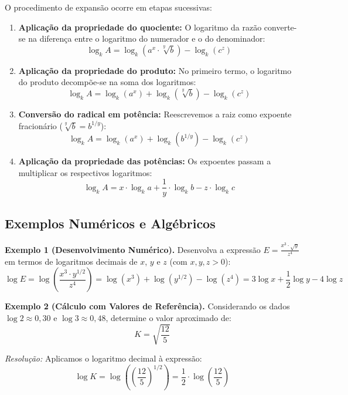 \documentclass[12pt,a4paper]{report}
\begin{document}
	O procedimento de expansão ocorre em etapas sucessivas:
	
	\begin{destaque}
		\begin{enumerate}[label=\textbf{\arabic*.}]
			\item \textbf{Aplicação da propriedade do quociente:}  
			O logaritmo da razão converte-se na diferença entre o logaritmo do numerador e o do denominador:
			$$\log_k A = \log_k \left( a^x \cdot \sqrt[y]{b} \right) - \log_k (c^z)$$
			
			\item \textbf{Aplicação da propriedade do produto:}  
			No primeiro termo, o logaritmo do produto decompõe-se na soma dos logaritmos:
			$$\log_k A = \log_k (a^x) + \log_k (\sqrt[y]{b}) - \log_k (c^z)$$
			
			\item \textbf{Conversão do radical em potência:}  
			Reescrevemos a raiz como expoente fracionário ($\sqrt[y]{b} = b^{1/y}$):
			$$\log_k A = \log_k (a^x) + \log_k \left( b^{1/y} \right) - \log_k (c^z)$$
			
			\item \textbf{Aplicação da propriedade das potências:}  
			Os expoentes passam a multiplicar os respectivos logaritmos:
			$$\log_k A = x \cdot \log_k a + \frac{1}{y} \cdot \log_k b - z \cdot \log_k c$$
		\end{enumerate}
	\end{destaque}
	
	\subsection*{Exemplos Numéricos e Algébricos}
	
	\textbf{Exemplo 1 (Desenvolvimento Numérico).} Desenvolva a expressão $E = \frac{x^3 \cdot \sqrt{y}}{z^4}$ em termos de logaritmos decimais de $x$, $y$ e $z$ (com $x, y, z > 0$):
	$$\log E = \log\left(\frac{x^3 \cdot y^{1/2}}{z^4}\right) = \log(x^3) + \log\left(y^{1/2}\right) - \log(z^4) = 3\log x + \frac{1}{2}\log y - 4\log z$$
	
	\vspace{0.3cm}
	
	\textbf{Exemplo 2 (Cálculo com Valores de Referência).} Considerando os dados $\log 2 \approx 0{,}30$ e $\log 3 \approx 0{,}48$, determine o valor aproximado de:
	$$K = \sqrt{\frac{12}{5}}$$
	
	\textit{Resolução:}  
	Aplicamos o logaritmo decimal à expressão:
	$$\log K = \log \left( \left(\frac{12}{5}\right)^{1/2} \right) = \frac{1}{2} \cdot \log\left(\frac{12}{5}\right)$$
	
\end{document}
